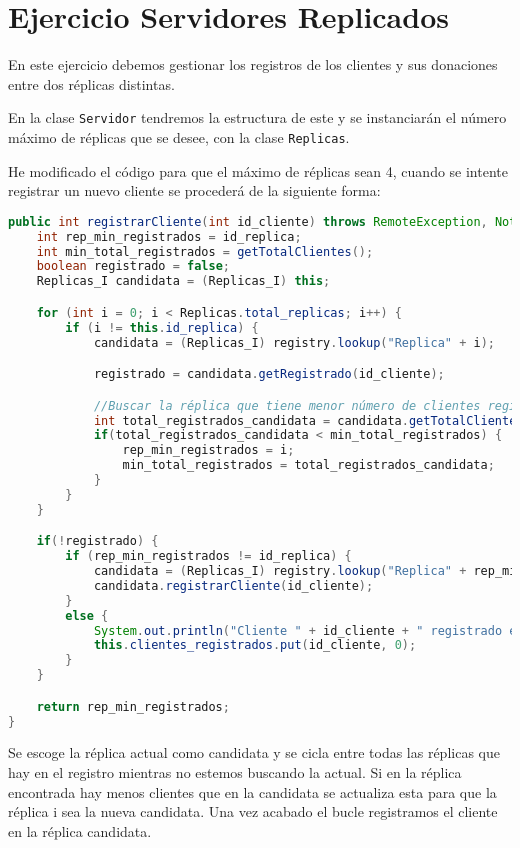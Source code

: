 \chapter{Ejercicio Servidores Replicados}
En este ejercicio debemos gestionar los registros de los clientes y sus donaciones
entre dos réplicas distintas.

En la clase \texttt{Servidor} tendremos la estructura de este y se instanciarán el
número máximo de réplicas que se desee, con la clase \texttt{Replicas}.

He modificado el código para que el máximo de réplicas sean 4, cuando se intente registrar un nuevo
cliente se procederá de la siguiente forma:

\begin{lstlisting}[language=java]
public int registrarCliente(int id_cliente) throws RemoteException, NotBoundException {
	int rep_min_registrados = id_replica;
	int min_total_registrados = getTotalClientes();
	boolean registrado = false;
	Replicas_I candidata = (Replicas_I) this;

	for (int i = 0; i < Replicas.total_replicas; i++) {
		if (i != this.id_replica) {
			candidata = (Replicas_I) registry.lookup("Replica" + i);

			registrado = candidata.getRegistrado(id_cliente);

			//Buscar la réplica que tiene menor número de clientes registrados
			int total_registrados_candidata = candidata.getTotalClientes();
			if(total_registrados_candidata < min_total_registrados) {
				rep_min_registrados = i;
				min_total_registrados = total_registrados_candidata;
			}
		}
	}

	if(!registrado) {
		if (rep_min_registrados != id_replica) {
			candidata = (Replicas_I) registry.lookup("Replica" + rep_min_registrados);
			candidata.registrarCliente(id_cliente);
		}
		else {
			System.out.println("Cliente " + id_cliente + " registrado en réplica " + this.id_replica);
			this.clientes_registrados.put(id_cliente, 0);
		}
	}

	return rep_min_registrados;
}
\end{lstlisting}

Se escoge la réplica actual como candidata y se cicla entre todas las réplicas que hay en el registro mientras
no estemos buscando la actual. Si en la réplica encontrada hay menos clientes que en la candidata se actualiza
esta para que la réplica i sea la nueva candidata. Una vez acabado el bucle registramos el cliente en la réplica candidata.

